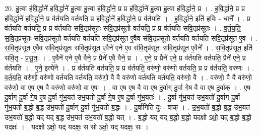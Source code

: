 \documentclass[17pt]{extarticle}
\begin{document}
20. हु॒त्वा ह॑वि॒र्द्धाने॑ हवि॒र्द्धाने॑ हु॒त्वा हु॒त्वा ह॑वि॒र्द्धाने॒ प्र प्र ह॑वि॒र्द्धाने॑ हु॒त्वा हु॒त्वा ह॑वि॒र्द्धाने॒ प्र । . ह॒वि॒र्द्धाने॒ प्र प्र ह॑वि॒र्द्धाने॑ हवि॒र्द्धाने॒ प्र व॑र्तयति वर्तयति॒ प्र ह॑वि॒र्द्धाने॑ हवि॒र्द्धाने॒ प्र व॑र्तयति । . ह॒वि॒र्द्धाने॒ इति॑ हविः - धाने᳚ । . प्र व॑र्तयति वर्तयति॒ प्र प्र व॑र्तयति सवि॒तृप्र॑सूतः सवि॒तृप्र॑सूतो वर्तयति॒ प्र प्र व॑र्तयति सवि॒तृप्र॑सूतः । . व॒र्त॒य॒ति॒ स॒वि॒तृप्र॑सूतः सवि॒तृप्र॑सूतो वर्तयति वर्तयति सवि॒तृप्र॑सूत ए॒वैव स॑वि॒तृप्र॑सूतो वर्तयति वर्तयति सवि॒तृप्र॑सूत ए॒व । . स॒वि॒तृप्र॑सूत ए॒वैव स॑वि॒तृप्र॑सूतः सवि॒तृप्र॑सूत ए॒वैने॑ एने ए॒व स॑वि॒तृप्र॑सूतः सवि॒तृप्र॑सूत ए॒वैने᳚ । . स॒वि॒तृप्र॑सूत॒ इति॑ सवि॒तृ - प्र॒सू॒तः॒ । . ए॒वैने॑ एने ए॒वै वैने॒ प्र प्रैने॑ ए॒वै वैने॒ प्र । . ए॒ने॒ प्र प्रैने॑ एने॒ प्र व॑र्तयति वर्तयति॒ प्रैने॑ एने॒ प्र व॑र्तयति । . ए॒ने॒ इत्ये॑ने । . प्र व॑र्तयति वर्तयति॒ प्र प्र व॑र्तयति॒ वरु॑णो॒ वरु॑णो वर्तयति॒ प्र प्र व॑र्तयति॒ वरु॑णः । . व॒र्त॒य॒ति॒ वरु॑णो॒ वरु॑णो वर्तयति वर्तयति॒ वरु॑णो॒ वै वै वरु॑णो वर्तयति वर्तयति॒ वरु॑णो॒ वै । . वरु॑णो॒ वै वै वरु॑णो॒ वरु॑णो॒ वा ए॒ष ए॒ष वै वरु॑णो॒ वरु॑णो॒ वा ए॒षः । . वा ए॒ष ए॒ष वै वा ए॒ष दु॒र्वाग् दु॒र्वा गे॒ष वै वा ए॒ष दु॒र्वाक् । . ए॒ष दु॒र्वाग् दु॒र्वा गे॒ष ए॒ष दु॒र्वा गु॑भ॒यत॑ उभ॒यतो॑ दु॒र्वा गे॒ष ए॒ष दु॒र्वा गु॑भ॒यतः॑ । . दु॒र्वा गु॑भ॒यत॑ उभ॒यतो॑ दु॒र्वाग् दु॒र्वा गु॑भ॒यतो॑ ब॒द्धो ब॒द्ध उ॑भ॒यतो॑ दु॒र्वाग् दु॒र्वा गु॑भ॒यतो॑ ब॒द्धः । . दु॒र्वागिति॑ दुः - वाक् । . उ॒भ॒यतो॑ ब॒द्धो ब॒द्ध उ॑भ॒यत॑ उभ॒यतो॑ ब॒द्धो यद् यद् ब॒द्ध उ॑भ॒यत॑ उभ॒यतो॑ ब॒द्धो यत् । . ब॒द्धो यद् यद् ब॒द्धो ब॒द्धो यदक्षो ऽक्षो॒ यद् ब॒द्धो ब॒द्धो यदक्षः॑ । . यदक्षो ऽक्षो॒ यद् यदक्षः॒ स सो ऽक्षो॒ यद् यदक्षः॒ सः । \newline
\end{document}
